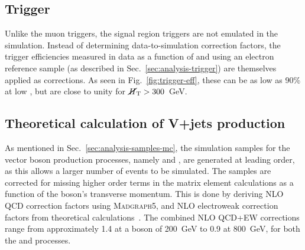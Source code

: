 
\subsection{Trigger}
\label{sec:analysis-mccorrections-trigger}
Unlike the muon triggers, the signal region triggers are not emulated in the 
simulation. Instead of determining data-to-simulation correction factors, the 
trigger efficiencies measured in data as a function of \scalht and \mht using 
an electron reference sample (as described in Sec.~\ref{sec:analysis-trigger}) 
are themselves applied as corrections. As seen in 
Fig.~\ref{fig:trigger-eff}, these can be as low as 90\% at low \mht, but 
are close to unity for $\mbox{$\cancel{H}_\text{T}$}>300$~GeV.

\subsection{Theoretical calculation of V+jets production}
\label{sec:analysis-mccorrections-nlo}
As mentioned in Sec.~\ref{sec:analysis-samples-mc}, the simulation samples for 
the vector boson production processes, namely \zj and \wj, are generated at 
leading order, as this allows a larger number of events to be simulated. 
The samples are corrected for missing higher order terms in the matrix element 
calculations as a function of the 
boson's transverse momentum. This is done by deriving NLO QCD correction 
factors using \textsc{Madgraph5}, and NLO electroweak correction factors from 
theoretical calculations~\cite{monojet36fb}. The combined NLO QCD+EW 
corrections 
range from approximately 1.4 at a boson \pt of 200~GeV to 0.9 at 800~GeV, for 
both the \zj and \wj processes.



